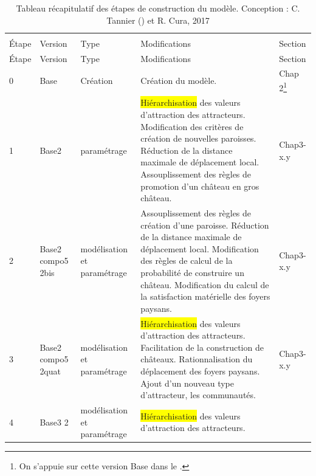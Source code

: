 	
	\pagebreak
	\begin{footnotesize}
		\begin{longtable}{ m{} m{}  m{}  m{}  m{}  }
			\caption{Tableau récapitulatif des étapes de construction du modèle. Conception : C. Tannier () et R. Cura, 2017}\\
			\label{table:etapes-construction}\\
			Étape & Version & Type & Modifications & Section\\
			\endfirsthead
			Étape & Version & Type & Modifications & Section\\
			\endhead			
			\hline
			0 & Base & Création & Création du modèle. \fixref{Cf. tableau 14 de Tannier 2017} & Chap 2\footnote{On s'appuie sur cette version \og Base\fg{} dans le \fixref{chapitre 2}.}\\
			\hline
			1 & Base2 & paramétrage & \colorbox{yellow}{Hiérarchisation} des valeurs d'attraction des attracteurs. \newline
			Modification des critères de création de nouvelles paroisses. \newline
			Réduction de la distance maximale de déplacement local. \newline
			Assouplissement des règles de promotion d'un château en gros château. & Chap3-x.y\\
			\hline
			2 & Base2 compo5 2bis & modélisation et paramétrage & Assouplissement des règles de création d'une paroisse.\newline
			Réduction de la distance maximale de déplacement local. \newline
			Modification des règles de calcul de la probabilité de construire un château.\newline
			Modification du calcul de la satisfaction matérielle des foyers paysans. & Chap3-x.y\\
			\hline
			3 & Base2 compo5 2quat & modélisation et paramétrage & \colorbox{yellow}{Hiérarchisation} des valeurs d'attraction des attracteurs. \newline
			Facilitation de la construction de châteaux. \newline
			Rationnalisation du déplacement des foyers paysans. \newline
			Ajout d'un nouveau type d'attracteur, les communautés. & Chap3-x.y\\
			\hline
			4 & Base3 2 & modélisation et paramétrage & \colorbox{yellow}{Hiérarchisation} des valeurs d'attraction des attracteurs. \newline

\end{longtable}
\end{footnotesize}

